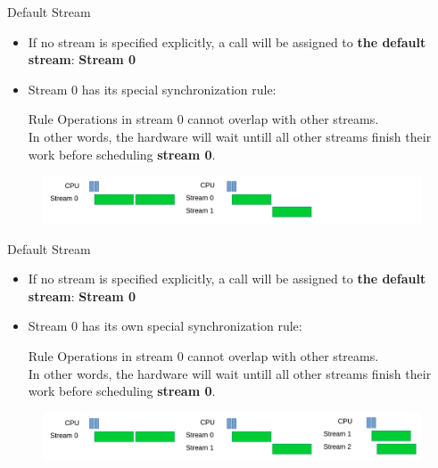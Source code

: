 \documentclass[9pt]{beamer}
\newcommand{\emphasize}[1]{\textbf{\color{red} #1 } }
\begin{document}
\begin{frame}[t]{Default Stream}
\begin{itemize}
\item If no stream is specified explicitly, a call will be assigned to \textbf{the default stream}: \emphasize{Stream 0}

\item Stream 0 has its special synchronization rule:
\begin{alertblock}{Rule}
Operations in stream 0 cannot overlap with other streams.\\
In other words, the hardware will wait untill all other streams finish their work before scheduling \textbf{stream 0}.
\end{alertblock}
\end{itemize}

\begin{figure}
\includegraphics[scale=0.25]{images/ans-kernel-launch-2.jpg}
\centering
\end{figure}

\end{frame}


\begin{frame}[t]{Default Stream}
\begin{itemize}
\item If no stream is specified explicitly, a call will be assigned to \textbf{the default stream}: \emphasize{Stream 0}

\item Stream 0 has its own special synchronization rule:
\begin{alertblock}{Rule}
Operations in stream 0 cannot overlap with other streams.\\
In other words, the hardware will wait untill all other streams finish their work before scheduling \textbf{stream 0}.
\end{alertblock}
\end{itemize}

\begin{figure}
\includegraphics[scale=0.25]{images/ans-kernel-launch-3.jpg}
\centering
\end{figure}

\end{frame}
\end{document}
